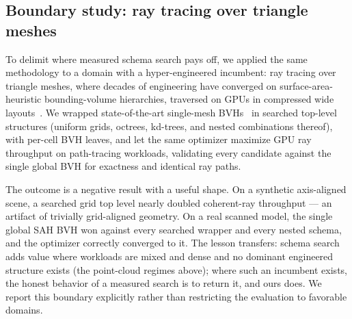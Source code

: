 \subsection{Boundary study: ray tracing over triangle meshes}
\label{sec:app-boundary}

To delimit where measured schema search pays off, we applied the same methodology to a domain with a hyper-engineered incumbent: ray tracing over triangle meshes, where decades of engineering have converged on surface-area-heuristic bounding-volume hierarchies, traversed on GPUs in compressed wide layouts~\cite{ylitie2017cwbvh}. We wrapped state-of-the-art single-mesh BVHs~\cite{bikker2024tinybvh} in searched top-level structures (uniform grids, octrees, kd-trees, and nested combinations thereof), with per-cell BVH leaves, and let the same optimizer maximize GPU ray throughput on path-tracing workloads, validating every candidate against the single global BVH for exactness and identical ray paths.

The outcome is a negative result with a useful shape. On a synthetic axis-aligned scene, a searched grid top level nearly doubled coherent-ray throughput --- an artifact of trivially grid-aligned geometry. On a real scanned model, the single global SAH BVH won against every searched wrapper and every nested schema, and the optimizer correctly converged to it. The lesson transfers: schema search adds value where workloads are mixed and dense and no dominant engineered structure exists (the point-cloud regimes above); where such an incumbent exists, the honest behavior of a measured search is to return it, and ours does. We report this boundary explicitly rather than restricting the evaluation to favorable domains.
